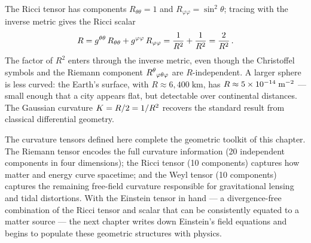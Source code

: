 The Ricci tensor has components $R_{\theta\theta} = 1$ and
$R_{\varphi\varphi} = \sin^2\!\theta$; tracing with the inverse metric gives
the Ricci scalar
%
\begin{equation}
  R = g^{\theta\theta}\,R_{\theta\theta}
    + g^{\varphi\varphi}\,R_{\varphi\varphi}
  = \frac{1}{R^2} + \frac{1}{R^2} = \frac{2}{R^2} \,.
  \label{eq:sphere-ricci-scalar}
\end{equation}
%
The factor of $R^2$ enters through the inverse metric, even though the
Christoffel symbols and the Riemann component
$R^{\theta}{}_{\varphi \theta \varphi}$ are $R$-independent.  A larger
sphere is less curved: the Earth's surface, with $R \approx 6{,}400\;\text{km}$,
has $R \approx 5 \times 10^{-14}\;\text{m}^{-2}$ --- small enough
that a city appears flat, but detectable over continental distances.  The
Gaussian curvature $K = R/2 = 1/R^2$ recovers the standard result
from classical differential geometry.

The curvature tensors defined here complete the geometric toolkit of this
chapter.  The Riemann tensor encodes the full curvature information (20
independent components in four dimensions); the Ricci tensor (10 components)
captures how matter and energy curve spacetime; and the Weyl tensor (10
components) captures the remaining free-field curvature responsible for
gravitational lensing and tidal distortions.  With the Einstein tensor in
hand --- a divergence-free combination of the Ricci tensor and scalar that can
be consistently equated to a matter source --- the next chapter writes down
Einstein's field equations and begins to populate these geometric structures
with physics.

